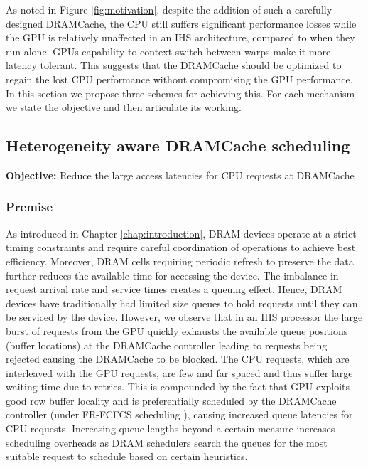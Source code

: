 As noted  in Figure \ref{fig:motivation}, despite the addition of such a carefully designed DRAMCache, the CPU still suffers significant performance losses while the GPU is relatively unaffected in an IHS architecture, compared to when they run alone. GPUs capability to context switch between warps make it more latency tolerant. This suggests that the DRAMCache should be optimized to regain the lost CPU performance without compromising the GPU performance. In this section we propose three schemes for achieving this. For each mechanism we state the objective and then articulate its working.


\subsection{Heterogeneity aware DRAMCache scheduling} 
\textbf{Objective:} Reduce the large access latencies for CPU requests at DRAMCache
\subsubsection{Premise}
As introduced in Chapter \ref{chap:introduction}, DRAM devices operate at a strict timing constraints and require careful coordination of operations to achieve best efficiency. Moreover, DRAM cells requiring periodic refresh to preserve the data further reduces the available time for accessing the device. The imbalance in request arrival rate and service times creates a queuing effect. Hence, DRAM devices have traditionally had limited size queues to hold requests until they can be serviced by the device. However, we observe that in an IHS processor the large burst of requests from the GPU quickly exhausts the available queue positions (buffer locations) at the DRAMCache controller leading to requests being rejected causing the DRAMCache to be blocked. 
The CPU requests, which are interleaved with the GPU requests, are few and far spaced and thus suffer large waiting time due to retries. This is compounded by the fact that GPU exploits good row buffer locality and is preferentially scheduled by the DRAMCache controller (under FR-FCFCS scheduling \cite{sms}), causing increased queue latencies for CPU requests. Increasing queue lengths beyond a certain measure increases scheduling overheads as DRAM schedulers search the queues for the most suitable request to schedule based on certain heuristics.

